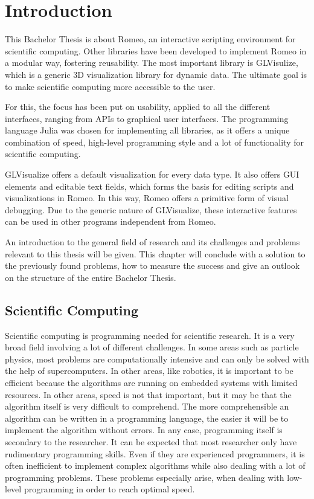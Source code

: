 \section{Introduction}
This Bachelor Thesis is about Romeo, an interactive scripting environment for scientific computing.
Other libraries have been developed to implement Romeo in a modular way, fostering reusability.
The most important library is GLVisulize, which is a generic 3D visualization library for dynamic data. 
The ultimate goal is to make scientific computing more accessible to the user. 

For this, the focus has been put on usability, applied to all the different interfaces, ranging from \ac{APIs} to graphical user interfaces. 
The programming language Julia was chosen for implementing all libraries, as it offers a unique combination of speed, high-level programming style and a lot of functionality for scientific computing.

GLVisualize offers a default visualization for every data type. 
It also offers \ac{GUI} elements and editable text fields, which forms the basis for editing scripts and visualizations in Romeo. 
In this way, Romeo offers a primitive form of visual debugging. 
Due to the generic nature of GLVisualize, these interactive features can be used in other programs independent from Romeo.

An introduction to the general field of research and its challenges and problems relevant to this thesis will be given.
This chapter will conclude with a solution to the previously found problems, how to measure the success and give an outlook on the structure of the entire Bachelor Thesis.


\subsection{Scientific Computing}

Scientific computing is programming needed for scientific research.
It is a very broad field involving a lot of different challenges. 
In some areas such as particle physics, most problems are computationally intensive and can only be solved with the help of supercomputers.
In other areas, like robotics, it is important to be efficient because the algorithms are running on embedded systems with limited resources. 
In other areas, speed is not that important, but it may be that the algorithm itself is very difficult to comprehend. 
The more comprehensible an algorithm can be written in a programming language, the easier it will be to implement the algorithm without errors.
In any case, programming itself is secondary to the researcher.
It can be expected that most researcher only have rudimentary programming skills. 
Even if they are experienced programmers, it is often inefficient to implement complex algorithms while also dealing with a lot of programming problems.
These problems especially arise, when dealing with low-level programming in order to reach optimal speed.

